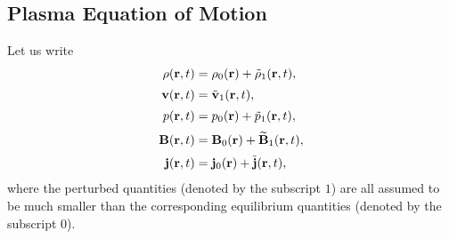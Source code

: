 \documentclass[12pt,prb,aps,notitlepage]{revtex4-1}
\begin{document}
\subsection{Plasma Equation of Motion}
Let us write
\begin{align}
\rho({\bf r},t) &= \rho_0({\bf r})+ \tilde{\rho}_1({\bf r},t),\\[0.5ex]
{\bf v}({\bf r},t) &= \tilde{\bf v}_1({\bf r},t),\\[0.5ex]
p({\bf r},t) &= p_0({\bf r})+ \tilde{p}_1({\bf r},t),\\[0.5ex]
{\bf B}({\bf r},t) &= {\bf B}_0({\bf r})+ \widetilde{\bf B}_1({\bf r},t),\\[0.5ex]
{\bf j}({\bf r},t) &= {\bf j}_0({\bf r})+ \tilde{\bf j}({\bf r},t),
\end{align}
where the perturbed quantities (denoted by the subscript $1$) are all assumed to be much smaller than
the corresponding equilibrium quantities (denoted by the subscript $0$).
\end{document}
